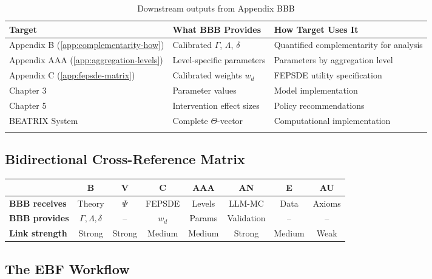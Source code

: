 \documentclass[11pt,a4paper]{article}
\theoremstyle{definition}
\begin{document}
\begin{longtable}{lp{4cm}p{6cm}}
\toprule
\textbf{Target} & \textbf{What BBB Provides} & \textbf{How Target Uses It} \\
\midrule
\endfirsthead
Appendix B (\ref{app:complementarity-how}) & Calibrated $\Gamma$, $\Lambda$, $\delta$ & Quantified complementarity for analysis \\
Appendix AAA (\ref{app:aggregation-levels}) & Level-specific parameters & Parameters by aggregation level \\
Appendix C (\ref{app:fepsde-matrix}) & Calibrated weights $w_d$ & FEPSDE utility specification \\
Chapter 3 & Parameter values & Model implementation \\
Chapter 5 & Intervention effect sizes & Policy recommendations \\
BEATRIX System & Complete $\Theta$-vector & Computational implementation \\
\bottomrule
\caption{Downstream outputs from Appendix BBB}
\end{longtable}

\subsection{Bidirectional Cross-Reference Matrix}

\begin{center}
\small
\begin{tabular}{l|ccccccc}
\toprule
& \textbf{B} & \textbf{V} & \textbf{C} & \textbf{AAA} & \textbf{AN} & \textbf{E} & \textbf{AU} \\
\midrule
\textbf{BBB receives} & Theory & $\Psi$ & FEPSDE & Levels & LLM-MC & Data & Axioms \\
\textbf{BBB provides} & $\Gamma,\Lambda,\delta$ & -- & $w_d$ & Params & Validation & -- & -- \\
\midrule
\textbf{Link strength} & Strong & Strong & Medium & Medium & Strong & Medium & Weak \\
\bottomrule
\end{tabular}
\end{center}

\subsection{The EBF Workflow}

\begin{center}
\end{center}
\end{document}
